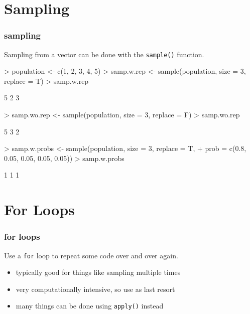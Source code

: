 \documentclass[handout]{beamer}
\newcommand{\red}{\color{red}}
\begin{document}
\section{Sampling}
\begin{frame}[fragile]
\frametitle{sampling}
Sampling from a vector can be done with the {\tt \red sample()} function.
\bigskip
\pause
\red
\footnotesize
\begin{Schunk}
\begin{Sinput}
> population <- c(1, 2, 3, 4, 5)
> samp.w.rep <- sample(population, size = 3, replace = T)
> samp.w.rep
\end{Sinput}
\begin{Soutput}
[1] 5 2 3
\end{Soutput}
\end{Schunk}
\pause
\medskip
\begin{Schunk}
\begin{Sinput}
> samp.wo.rep <- sample(population, size = 3, replace = F)
> samp.wo.rep
\end{Sinput}
\begin{Soutput}
[1] 5 3 2
\end{Soutput}
\end{Schunk}
\pause
\medskip
\begin{Schunk}
\begin{Sinput}
> samp.w.probs <- sample(population, size = 3, replace = T, 
+     prob = c(0.8, 0.05, 0.05, 0.05, 0.05))
> samp.w.probs
\end{Sinput}
\begin{Soutput}
[1] 1 1 1
\end{Soutput}
\end{Schunk}
\end{frame}

\section{For Loops}
\begin{frame}
\frametitle{for loops}
Use a {\tt \red for} loop to repeat some code over and over again.
\pause
\bigskip
\begin{itemize}
\item typically good for things like sampling multiple times
\pause
\item very computationally intensive, so use as last resort
\pause
\item many things can be done using {\tt \red apply()} instead
\end{itemize}
\end{frame}
\end{document}
